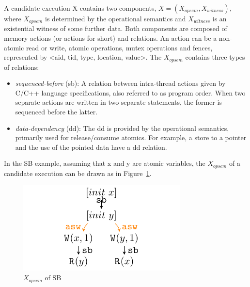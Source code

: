 A candidate execution X contains two components, $X = (X_{opsem}, X_{witness})$, where $X_{opsem}$ is determined by the operational semantics and $X_{witness}$ is an existential witness of some further data. Both components are composed of memory actions (or actions for short) and relations. An action can be a non-atomic read or write, atomic operations, mutex operations and fences, represented by <aid, tid, type, location, value>. The $X_{opsem}$ contains three types of relations:

\begin{itemize}
	\item \textit{sequenced-before} (sb): A relation between intra-thread actions given by C/C++ language specifications, also referred to as program order. When two separate actions are written in two separate statements, the former is sequenced before the latter. 
	\item \textit{data-dependency} (dd):  The dd is provided by the operational semantics, primarily used for release/consume atomics. For example, a store to a pointer and the use of the pointed data have a dd relation.
\end{itemize}

In the SB example,  assuming that x and y are atomic variables, the $X_{opsem}$ of a candidate execution can be drawn as in Figure~\ref{XopsemSB}.


\begin{figure}[h!tbp] %
	\centering
	\includegraphics[scale=1.3]{figure/exec-graph/SB1.pdf} %
	\caption{$X_{opsem}$ of SB} %
	\label{XopsemSB} %
\end{figure}

